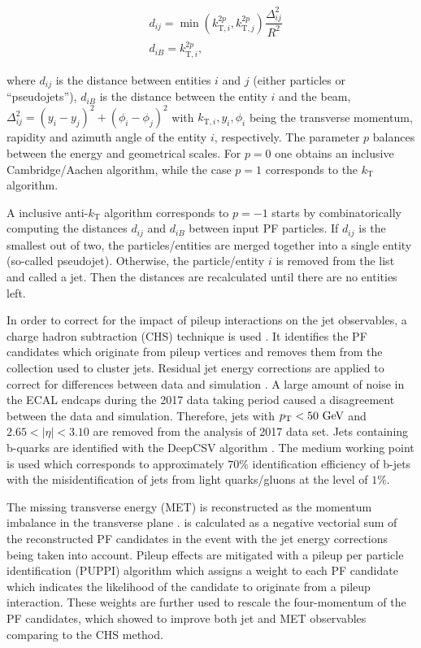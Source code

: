 \begin{align}
    &d_{ij} = \min(k_{\text{T},i}^{2p},k_{\text{T},j}^{2p})\dfrac{\Delta^2_{ij}}{R^2}\\
    &d_{iB} = k_{\text{T},i}^{2p},
\end{align}

where $d_{ij}$ is the distance between entities $i$ and $j$ (either particles or \enquote{pseudojets}), $d_{iB}$ is the distance between the entity $i$ and the beam,  $\Delta^2_{ij} = (y_i-y_j)^2 + (\phi_i - \phi_j)^2$ with $k_{\text{T},i}, y_i, \phi_i$ being the transverse momentum, rapidity and azimuth angle of the entity $i$, respectively. The parameter $p$ balances between the energy and geometrical scales. For $p=0$ one obtains an inclusive Cambridge/Aachen algorithm, while the case $p=1$ corresponds to the $k_\text{T}$ algorithm.

A inclusive anti-$k_\text{T}$ algorithm corresponds to $p=-1$ starts by combinatorically computing the distances $d_{ij}$ and $d_{iB}$ between input PF particles. If $d_{ij}$ is the smallest out of two, the particles/entities are merged together into a single entity (so-called pseudojet). Otherwise, the particle/entity $i$ is removed from the list and called a jet. Then the distances are recalculated until there are no entities left.

In order to correct for the impact of pileup interactions on the jet observables, a charge hadron subtraction (CHS) technique is used \cite{CMS-PAS-JME-14-001}. It identifies the PF candidates which originate from pileup vertices and removes them from the collection used to cluster jets. Residual jet energy corrections are applied to correct for differences between data and simulation \cite{CMS:2016lmd}. A large amount of noise in the ECAL endcaps during the 2017 data taking period caused a disagreement between the data and simulation. Therefore, jets with $p_{\text{T}} < 50~\text{GeV}$ and $2.65 < |\eta| < 3.10$ are removed from the analysis of 2017 data set. Jets containing b-quarks are identified with the DeepCSV algorithm \cite{CMS:2017wtu}. The medium working point is used which corresponds to approximately $70\%$ identification efficiency of b-jets with the misidentification of jets from light quarks/gluons at the level of $1\%$.

The missing transverse energy (MET) \met is reconstructed as the momentum imbalance in the transverse plane \cite{CMS:2019ctu}. \met is calculated as a negative vectorial sum of the reconstructed PF candidates in the event with the jet energy corrections being taken into account. Pileup effects are mitigated with a pileup per particle identification (PUPPI) algorithm \cite{Bertolini:2014bba} which assigns a weight to each PF candidate which indicates the likelihood of the candidate to originate from a pileup interaction. These weights are further used to rescale the four-momentum of the PF candidates, which showed to improve both jet and MET observables comparing to the CHS method.


